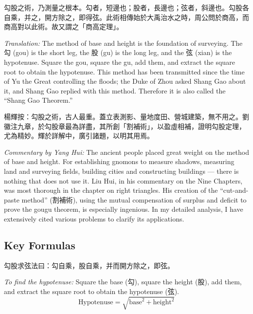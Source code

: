 \documentclass[11pt,a4paper]{article}
\newcommand{\zh}[1]{{#1}}
\newenvironment{chpassage}{%
  \par\medskip
  \begin{center}
  \begin{minipage}{0.95\textwidth}
  \setlength{\parindent}{2em}
  \linespread{1.3}\selectfont
}{%
  \end{minipage}
  \end{center}
  \medskip
}
\begin{document}
\begin{chpassage}
\zh{勾股之術，乃測量之根本。勾者，短邊也；股者，長邊也；弦者，斜邊也。勾股各自乘，并之，開方除之，即得弦。此術相傳始於大禹治水之時，周公問於商高，而商高對以此術。故又謂之「商高定理」。}

\medskip
\textit{Translation:} The method of base and height is the foundation of
surveying. The \zh{勾} (gou) is the short leg, the \zh{股} (gu) is the long
leg, and the \zh{弦} (xian) is the hypotenuse. Square the gou, square the
gu, add them, and extract the square root to obtain the hypotenuse. This
method has been transmitted since the time of Yu the Great controlling the
floods; the Duke of Zhou asked Shang Gao about it, and Shang Gao replied with
this method. Therefore it is also called the ``Shang Gao Theorem.''
\end{chpassage}

\begin{chpassage}
\zh{楊輝按：勾股之術，古人最重。蓋立表測影、量地度田、營城建築，無不用之。劉徽注九章，於勾股章最為詳盡，其所創「割補術」，以盈虛相補，證明勾股定理，尤為精妙。輝於詳解中，廣引諸題，以明其用焉。}

\medskip
\textit{Commentary by Yang Hui:} The ancient people placed great weight on the
method of base and height. For establishing gnomons to measure shadows,
measuring land and surveying fields, building cities and constructing
buildings --- there is nothing that does not use it. Liu Hui, in his
commentary on the Nine Chapters, was most thorough in the chapter on right
triangles. His creation of the ``cut-and-paste method'' (\zh{割補術}), using
the mutual compensation of surplus and deficit to prove the gougu theorem,
is especially ingenious. In my detailed analysis, I have extensively cited
various problems to clarify its applications.
\end{chpassage}

\subsection{Key Formulas}

\begin{chpassage}
\zh{勾股求弦法曰：勾自乘，股自乘，并而開方除之，即弦。}

\medskip
\textit{To find the hypotenuse:} Square the base (\zh{勾}), square the
height (\zh{股}), add them, and extract the square root to obtain the
hypotenuse (\zh{弦}).
\[
\text{Hypotenuse} = \sqrt{\text{base}^2 + \text{height}^2}
\]
\end{chpassage}
\end{document}
